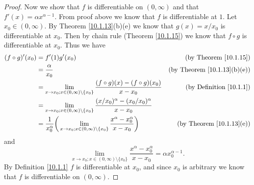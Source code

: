 \begin{proof}
    Now we show that \(f\) is differentiable on \((0, \infty)\) and that \(f'(x) = \alpha x^{\alpha - 1}\).
    From proof above we know that \(f\) is differentiable at \(1\).
    Let \(x_0 \in (0, \infty)\).
    By Theorem \ref{10.1.13}(b)(e) we know that \(g(x) = x / x_0\) is differentiable at \(x_0\).
    Then by chain rule (Theorem \ref{10.1.15}) we know that \(f \circ g\) is differentiable at \(x_0\).
    Thus we have
    \begin{align*}
        (f \circ g)'(x_0) & = f'(1) g'(x_0)                                                                                                                       & \text{(by Theorem \ref{10.1.15})}       \\
                          & = \frac{\alpha}{x_0}                                                                                                                  & \text{(by Theorem \ref{10.1.13}(b)(e))} \\
                          & = \lim_{x \to x_0 ; x \in (0, \infty) \setminus \{x_0\}} \frac{(f \circ g)(x) - (f \circ g)(x_0)}{x - x_0}                            & \text{(by Definition \ref{10.1.1})}     \\
                          & = \lim_{x \to x_0 ; x \in (0, \infty) \setminus \{x_0\}} \frac{(x / x_0)^{\alpha} - (x_0 / x_0)^{\alpha}}{x - x_0}                                                              \\
                          & = \frac{1}{x_0^{\alpha}} \bigg(\lim_{x \to x_0 ; x \in (0, \infty) \setminus \{x_0\}} \frac{x^{\alpha} - x_0^{\alpha}}{x - x_0}\bigg) & \text{(by Theorem \ref{10.1.13}(e))}
    \end{align*}
    and
    \[
        \lim_{x \to x_0 ; x \in (0, \infty) \setminus \{x_0\}} \frac{x^{\alpha} - x_0^{\alpha}}{x - x_0} = \alpha x_0^{\alpha - 1}.
    \]
    By Definition \ref{10.1.1} \(f\) is differentiable at \(x_0\), and since \(x_0\) is arbitrary we know that \(f\) is differentiable on \((0, \infty)\).
\end{proof}